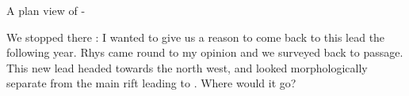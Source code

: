 \begin{survey}[t!]
	\checkoddpage \ifoddpage \forcerectofloat \else \forceversofloat \fi
	\centering
	\caption[Lazarus (grade 1)]{A plan view of  -}
	\label{lazarus plan}
\end{survey}

We stopped there : I wanted to give us a reason to come back to this lead the following year. Rhys came round to my opinion and we surveyed back to  passage. This new lead headed towards the north west, and looked morphologically separate from the main rift leading to . Where would it go?





